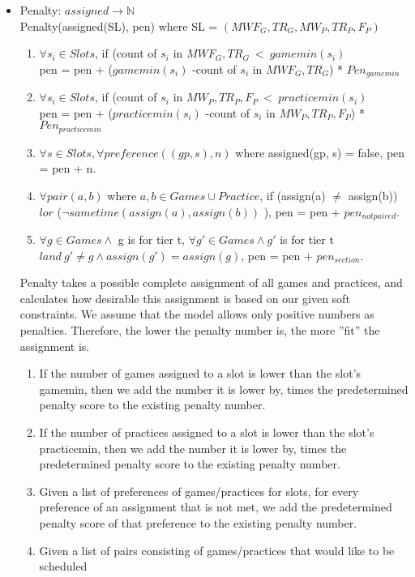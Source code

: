 \documentclass[12 pt]{article}        	%
\begin{document}
\begin{itemize}
\item Penalty: $assigned \to \mathbb{N}$
\\Penalty(assigned(SL), pen) where SL = $(MWF_G, TR_G, MW_P, TR_P, F_P)$
    \begin{enumerate}
        \item $\forall s_i \in Slots$, if (count of $s_i$ in $MWF_G, TR_G \: < \: gamemin(s_i)$
        \\pen = pen + ($gamemin(s_i)$ -count of $s_i$ in $MWF_G, TR_G$) * $Pen_{gamemin}$
        \item $\forall s_i \in Slots$, if (count of $s_i$ in $MW_P, TR_P, F_P \: < \: practicemin(s_i)$
        \\pen = pen + ($practicemin(s_i)$ -count of $s_i$ in $MW_P, TR_P, F_P$) * $Pen_{practicemin}$
        \item $\forall s \in Slots, \forall preference((gp, s), n)$ where assigned(gp, s) = false, pen = pen + n. 
        \item $\forall pair(a,b)$ where $a,b \in Games \cup Practice$, if (assign(a) $\neq$ assign(b)) $lor$ ($\neg sametime(assign(a), assign(b))$ ), pen = pen + $pen_{notpaired}$. 
        \item $\forall g \in Games \land $ g is for tier t, $\forall g' \in Games \land g'$ is for tier t $land \: g' \neq g \land assign(g') = assign(g)$, pen = pen + $pen_{section}$. 
    \end{enumerate}
Penalty takes a possible complete assignment of all games and practices, and calculates how desirable this assignment is based on our given soft constraints. We
assume that the model allows only positive numbers as penalties. Therefore, the
lower the penalty number is, the more ”fit” the assignment is.
\begin{enumerate}
    \item If the number of games assigned to a slot is lower than the slot’s gamemin,
then we add the number it is lower by, times the predetermined penalty score
to the existing penalty number.
    \item If the number of practices assigned to a slot is lower than the slot’s practicemin,
then we add the number it is lower by, times the predetermined penalty score
to the existing penalty number.
    \item Given a list of preferences of games/practices for slots, for every preference of
an assignment that is not met, we add the predetermined penalty score of that
preference to the existing penalty number.
    \item Given a list of pairs consisting of games/practices that would like to be scheduled

\end{enumerate}
\end{itemize}
\end{document}
